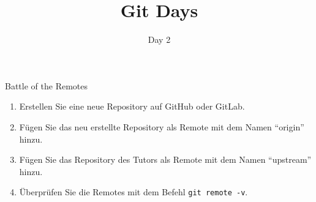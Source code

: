 \documentclass[
    english, accentcolor=TUDa-1c,
    fontsize= 12pt, a4paper, aspectratio=169, colorback=true, fancy_row_colors, boxarc=3pt,
]{algoexercise}
\title{Git Days}
\subtitle{Day 2}
\begin{document}
    \maketitle

    \begin{task}{Battle of the Remotes}
        \begin{enumerate}
            \item Erstellen Sie eine neue Repository auf GitHub oder GitLab.
            \item Fügen Sie das neu erstellte Repository als Remote mit dem Namen \enquote{origin} hinzu.
            \item Fügen Sie das Repository des Tutors als Remote mit dem Namen \enquote{upstream} hinzu.
            \item Überprüfen Sie die Remotes mit dem Befehl \texttt{git remote -v}.
        \end{enumerate}
    \end{task}
\end{document}
